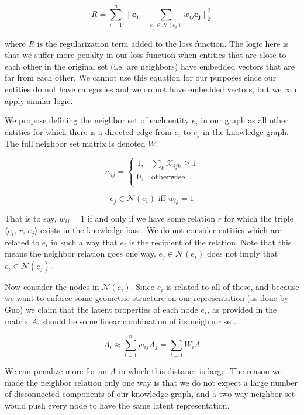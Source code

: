 \documentclass[pageno]{final_paper}
\begin{document}
$$R = \sum_{i=1}^n \lVert \mathbf{e_i} - \sum_{e_j \in \mathcal{N}(e_i)} w_{ij}
\mathbf{e_j} \rVert_2^2$$

where $R$ is the regularization term added to the loss function. The logic here
is that we suffer more penalty in our loss function when entities that are close
to each other in the original set (i.e. are neighbors) have embedded vectors
that are far from each other. We cannot use this equation for our purposes since
our entities do not have categories and we do not have embedded vectors, but we
can apply similar logic.

We propose defining the neighbor set of each entity $e_i$ in our graph as all
other entities for which there is a directed edge from $e_i$ to $e_j$ in the
knowledge graph. The full neighbor set matrix is denoted $W$.

\begin{equation}
    \label{eq: new wij}
    w_{ij} =
    \begin{cases}
        1, & \sum_k \mathcal{X}_{ijk} \geq 1 \\
        0, & \text{otherwise} \\
    \end{cases}
\end{equation}

\begin{equation}
    \label{eq: new neighbor set}
    e_j \in \mathcal{N}(e_i) \text{ iff } w_{ij} = 1
\end{equation}

That is to say, $w_{ij} = 1$ if and only if we have some relation $r$ for which
the triple $\langle e_i,\,r,\,e_j \rangle$ exists in the knowledge base. We do
not consider entities which are related to $e_i$ in such a way that $e_i$ is the
recipient of the relation. Note that this means the neighbor relation goes one
way. $e_j \in \mathcal{N}(e_i)$ does not imply that $e_i \in \mathcal{N}(e_j)$.

Now consider the nodes in $\mathcal{N}(e_i)$. Since $e_i$ is related to all of
these, and because we want to enforce some geometric structure on our
representation (as done by Guo) we claim that the latent properties of each node
$e_i$, as provided in the matrix $A$, should be some linear combination of its
neighbor set.

$$ A_i \approx \sum_{i=1}^n w_{ij}A_j = \sum_{i=1} W_iA$$

We can penalize more for an $A$ in which this distance is large. The reason we
made the neighbor relation only one way is that we do not expect a large number
of disconnected components of our knowledge graph, and a two-way neighbor set
would push every node to have the same latent representation. \\
\end{document}

